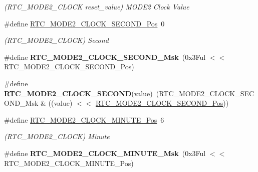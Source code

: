 \begin{DoxyCompactItemize}
\begin{DoxyCompactList}\small\item\em (R\+T\+C\+\_\+\+M\+O\+D\+E2\+\_\+\+C\+L\+O\+C\+K reset\+\_\+value) M\+O\+D\+E2 Clock Value \end{DoxyCompactList}\item 
\hypertarget{group___s_a_m_l21___r_t_c_ga368c2a354db0016d62123db167a8e38f}{}\#define \hyperlink{group___s_a_m_l21___r_t_c_ga368c2a354db0016d62123db167a8e38f}{R\+T\+C\+\_\+\+M\+O\+D\+E2\+\_\+\+C\+L\+O\+C\+K\+\_\+\+S\+E\+C\+O\+N\+D\+\_\+\+Pos}~0\label{group___s_a_m_l21___r_t_c_ga368c2a354db0016d62123db167a8e38f}

\begin{DoxyCompactList}\small\item\em (R\+T\+C\+\_\+\+M\+O\+D\+E2\+\_\+\+C\+L\+O\+C\+K) Second \end{DoxyCompactList}\item 
\hypertarget{group___s_a_m_l21___r_t_c_ga5d356ddc55d97f3dd567cf63555a9d92}{}\#define {\bfseries R\+T\+C\+\_\+\+M\+O\+D\+E2\+\_\+\+C\+L\+O\+C\+K\+\_\+\+S\+E\+C\+O\+N\+D\+\_\+\+Msk}~(0x3\+Ful $<$$<$ R\+T\+C\+\_\+\+M\+O\+D\+E2\+\_\+\+C\+L\+O\+C\+K\+\_\+\+S\+E\+C\+O\+N\+D\+\_\+\+Pos)\label{group___s_a_m_l21___r_t_c_ga5d356ddc55d97f3dd567cf63555a9d92}

\item 
\hypertarget{group___s_a_m_l21___r_t_c_ga0bd867728f1726d29e5b11f8ec801d08}{}\#define {\bfseries R\+T\+C\+\_\+\+M\+O\+D\+E2\+\_\+\+C\+L\+O\+C\+K\+\_\+\+S\+E\+C\+O\+N\+D}(value)~(R\+T\+C\+\_\+\+M\+O\+D\+E2\+\_\+\+C\+L\+O\+C\+K\+\_\+\+S\+E\+C\+O\+N\+D\+\_\+\+Msk \& ((value) $<$$<$ \hyperlink{group___s_a_m_l21___r_t_c_ga368c2a354db0016d62123db167a8e38f}{R\+T\+C\+\_\+\+M\+O\+D\+E2\+\_\+\+C\+L\+O\+C\+K\+\_\+\+S\+E\+C\+O\+N\+D\+\_\+\+Pos}))\label{group___s_a_m_l21___r_t_c_ga0bd867728f1726d29e5b11f8ec801d08}

\item 
\hypertarget{group___s_a_m_l21___r_t_c_ga6833c1b1a7d09a2acde357c93ffaa723}{}\#define \hyperlink{group___s_a_m_l21___r_t_c_ga6833c1b1a7d09a2acde357c93ffaa723}{R\+T\+C\+\_\+\+M\+O\+D\+E2\+\_\+\+C\+L\+O\+C\+K\+\_\+\+M\+I\+N\+U\+T\+E\+\_\+\+Pos}~6\label{group___s_a_m_l21___r_t_c_ga6833c1b1a7d09a2acde357c93ffaa723}

\begin{DoxyCompactList}\small\item\em (R\+T\+C\+\_\+\+M\+O\+D\+E2\+\_\+\+C\+L\+O\+C\+K) Minute \end{DoxyCompactList}\item 
\hypertarget{group___s_a_m_l21___r_t_c_ga392a7abb4aaf2008699481461e3295a9}{}\#define {\bfseries R\+T\+C\+\_\+\+M\+O\+D\+E2\+\_\+\+C\+L\+O\+C\+K\+\_\+\+M\+I\+N\+U\+T\+E\+\_\+\+Msk}~(0x3\+Ful $<$$<$ R\+T\+C\+\_\+\+M\+O\+D\+E2\+\_\+\+C\+L\+O\+C\+K\+\_\+\+M\+I\+N\+U\+T\+E\+\_\+\+Pos)\label{group___s_a_m_l21___r_t_c_ga392a7abb4aaf2008699481461e3295a9}


\end{DoxyCompactItemize}
